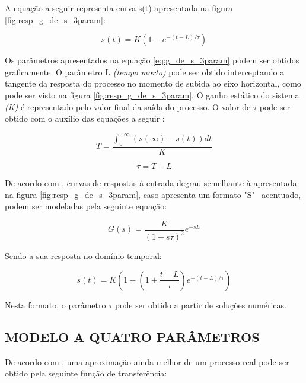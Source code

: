\documentclass[12pt,oneside,a4paper, chapter=TITLE, section = TITLE, english, brazil]{abntex2}
\begin{document}
A equação a seguir representa curva s(t) apresentada na figura \ref{fig:resp_g_de_s_3param}:

\begin{equation}
s(t) = K(1 - e^{-(t-L)/\tau}) \label{g_de_t_2param}
\end{equation}

Os parâmetros apresentados na equação \ref{eq:g_de_s_3param} podem ser obtidos graficamente. O parâmetro L \textit{(tempo morto)} pode ser obtido interceptando a tangente da resposta do processo no momento de subida ao eixo horizontal, como pode ser visto na figura \ref{fig:resp_g_de_s_3param}. O ganho estático do sistema \textit{(K)} é representado pelo valor final da saída do processo. O valor de $\tau$ pode ser obtido com o auxílio das equações a seguir \cite{astrom}:

\begin{equation}
T = \frac{\int^{+\infty}_0 (s(\infty) - s(t))dt}{K} \label{eq:tau_g_de_s_3param_1}
\end{equation}

\begin{equation}
\tau = T - L \label{eq:tau_g_de_s_3param_2}
\end{equation}

De acordo com , curvas de respostas à entrada degrau semelhante à apresentada na figura \ref{fig:resp_g_de_s_3param}, caso apresenta um formato "S" \ acentuado, podem ser modeladas pela seguinte equação:

\begin{equation}
G(s) = \frac{K}{(1 + s\tau)^2}e^{-sL} \label{eq:g_de_s_3param_2}
\end{equation}

Sendo a sua resposta no domínio temporal:

\begin{equation}
s(t) = K(1- (1 + \frac{t-L}{\tau})e^{-(t-L)/\tau}) \label{eq:g_de_t_3param_2}
\end{equation}

Nesta formato, o parâmetro $\tau$ pode ser obtido a partir de soluções numéricas.

\subsection{MODELO A QUATRO PARÂMETROS}

De acordo com , uma aproximação ainda melhor de um processo real pode ser obtido pela seguinte função de transferência:
\end{document}
